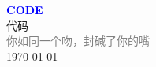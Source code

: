 \vspace*{\fill}
\begin{center}
    \textcolor{blue}{\Huge\textbf{CODE}} \\[1em]
    \textcolor{blue!60!black}{\Large 代码} \\[2em]
    \textcolor{gray}{\large 你如同一个吻，封碱了你的嘴} \\[1em]
    \today
\end{center}
\vspace*{\fill}
\clearpage


\clearpage

\clearpage

\clearpage


